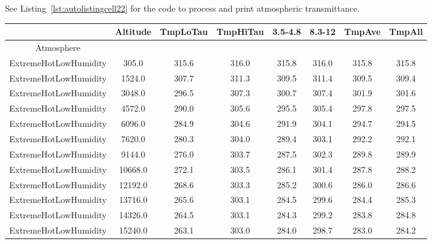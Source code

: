 \documentclass{workpackage}
\begin{document}
See Listing~\ref{lst:autolistingcell22} for the code to process and print atmospheric transmittance.

\begin{center}

\begin{normalsize}

\begin{tabular}{|c|c|c|c|c|c|c|c|}
\hline
&Altitude&TmpLoTau&TmpHiTau&3.5-4.8&8.3-12&TmpAve&TmpAll\\\hline
Atmosphere&&&&&&&\\\hline
ExtremeHotLowHumidity&305.0&315.6&316.0&315.8&316.0&315.8&315.8\\\hline
ExtremeHotLowHumidity&1524.0&307.7&311.3&309.5&311.4&309.5&309.4\\\hline
ExtremeHotLowHumidity&3048.0&296.5&307.3&300.7&307.4&301.9&301.6\\\hline
ExtremeHotLowHumidity&4572.0&290.0&305.6&295.5&305.4&297.8&297.5\\\hline
ExtremeHotLowHumidity&6096.0&284.9&304.6&291.9&304.1&294.7&294.5\\\hline
ExtremeHotLowHumidity&7620.0&280.3&304.0&289.4&303.1&292.2&292.1\\\hline
ExtremeHotLowHumidity&9144.0&276.0&303.7&287.5&302.3&289.8&289.9\\\hline
ExtremeHotLowHumidity&10668.0&272.1&303.5&286.1&301.4&287.8&288.2\\\hline
ExtremeHotLowHumidity&12192.0&268.6&303.3&285.2&300.6&286.0&286.6\\\hline
ExtremeHotLowHumidity&13716.0&265.6&303.1&284.5&299.6&284.4&285.3\\\hline
ExtremeHotLowHumidity&14326.0&264.5&303.1&284.3&299.2&283.8&284.8\\\hline
ExtremeHotLowHumidity&15240.0&263.1&303.0&284.0&298.7&283.0&284.2\\\hline

\end{tabular}
\end{normalsize}
\end{center}
\end{document}
